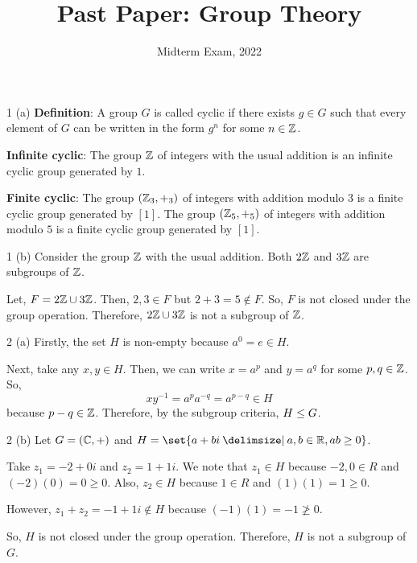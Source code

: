\documentclass[11pt]{penrose}
\title{Past Paper: Group Theory}
\subtitle{Midterm Exam, 2022}
\begin{document}
\maketitle
\warningtext

\begin{problem}{1 (a)}
    \textbf{Definition}: A group $G$ is called cyclic if there exists $g \in G$ such that every element of $G$ can be written in the form $g^n$ for some $n \in \mathbb{Z}$.

    \textbf{Infinite cyclic}: The group $\mathbb{Z}$ of integers with the usual addition is an infinite cyclic group generated by $1$.
    
    \textbf{Finite cyclic}: The group $(\mathbb{Z}_3, +_3)$ of integers with addition modulo $3$ is a finite cyclic group generated by $[1]$. The group $(\mathbb{Z}_5, +_5)$ of integers with addition modulo $5$ is a finite cyclic group generated by $[1]$.
\end{problem}

\begin{problem}{1 (b)}
    Consider the group $\mathbb{Z}$ with the usual addition. Both $2\mathbb{Z}$ and $3\mathbb{Z}$ are subgroups of $\mathbb{Z}$. 

    Let, $F = 2\mathbb{Z} \cup 3\mathbb{Z}$. Then, $2, 3 \in F$ but $2+3 = 5 \notin F$. So, $F$ is not closed under the group operation. Therefore, $2\mathbb{Z} \cup 3\mathbb{Z}$ is not a subgroup of $\mathbb{Z}$.
\end{problem}

\begin{problem}{2 (a)}
    Firstly, the set $H$ is non-empty because $a^0 = e \in H$.

    Next, take any $x, y \in H$. Then, we can write $x = a^p$ and $y = a^q$ for some $p, q \in \mathbb{Z}$. So,
    \begin{equation*}
        x y^{-1} = a^p a^{-q} = a^{p-q} \in H
    \end{equation*}
    because $p-q \in \mathbb{Z}$. Therefore, by the subgroup criteria, $H \mathrel{\leq} G$.
\end{problem}

\begin{problem}{2 (b)}
    Let $G = (\mathbb{C}, +)$ and $H = \set{a+bi \st a,b \in \R, ab \geq 0}$.

    Take $z_1 = -2 + 0i$ and $z_2 = 1 + 1i$. We note that $z_1 \in H$ because $-2, 0 \in R$ and $(-2)(0) = 0 \geq 0$. Also, $z_2 \in H$ because $1 \in R$ and $(1)(1) = 1 \geq 0$.

    However, $z_1 + z_2 = -1 + 1i \notin H$ because $(-1)(1) = -1 \ngeq 0$.

    So, $H$ is not closed under the group operation. Therefore, $H$ is not a subgroup of $G$.
\end{problem}
\end{document}

